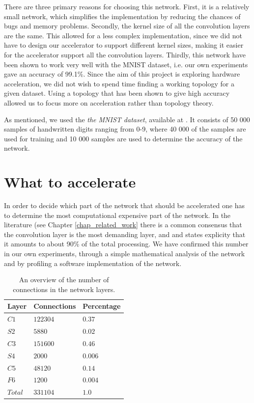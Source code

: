 There are three primary reasons for choosing this network. First, it is a relatively small network, which simplifies the implementation by reducing the chances of bugs and memory problems. Secondly, the kernel size of all the convolution layers are the same. This allowed for a less complex implementation, since we did not have to design our accelerator to support different kernel sizes, making it easier for the accelerator support all the convolution layers. Thirdly, this network have been shown to work very well with the MNIST dataset, i.e. our own experiments gave an accuracy of 99.1\%. Since the aim of this project is exploring hardware acceleration, we did not wish to spend time finding a working topology for a given dataset. Using a topology that has been shown to give high accuracy allowed us to focus more on acceleration rather than topology theory.   

 As mentioned, we used the \textit{the MNIST dataset}, available at \cite{MNIST}. It consists of 50 000 samples of handwritten digits ranging from 0-9, where 40 000 of the samples are used for
training and 10 000 samples are used to determine the accuracy of the network. 

\section{What to accelerate}

In order to decide which part of the network that should be accelerated one has to determine the most computational expensive part of the network. In the literature (see Chapter \ref{chap_related_work} there is a common consensus that the convolution layer is the most demanding layer, and \cite{Lechun latest} and \cite{chinese_paper} states explicity that it amounts to about 90\% of the total processing. We have confirmed this number in our own experiments, through a simple mathematical analysis of the network and by profiling a software implementation of the network. 

\begin{table}
	\centering
    \begin{tabular}{| >{\centering\arraybackslash}m{0.8in} | >{\centering\arraybackslash}m{1.0in} | >{\centering\arraybackslash}m{1.0in} |}
    \hline
    Layer & Connections & Percentage  \\ \hline
    $ C1 $ & $ 122304 $ & $ 0.37 $ \\ \hline
    $ S2 $ & $ 5880  $ & $ 0.02 $ \\ \hline
    $ C3 $ & $ 151600 $ & $ 0.46 $  \\ \hline
    $ S4 $ & $ 2000 $ & $ 0.006 $ \\ \hline
    $ C5 $ & $ 48120 $ & $ 0.14 $  \\ \hline
    $ F6 $ & $ 1200 $ & $ 0.004 $ \\ \hline
    $ Total $ & $ 331104 $ & $ 1.0 $  \\ \hline
        \end{tabular}
    \caption{An overview of the number of connections in the network layers.}
   	\label{tab_nofOps}
\end{table}

